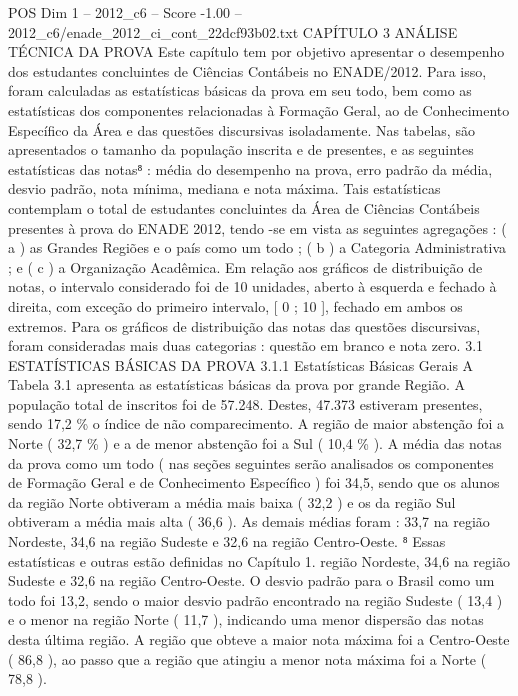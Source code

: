 \begin{textsample}{POS Dim 1 – 2012\_c6 – Score -1.00 – 2012\_c6/enade\_2012\_ci\_cont\_22dcf93b02.txt}  \label{ex:f1_pos_182}
CAPÍTULO 3 ANÁLISE TÉCNICA DA PROVA Este capítulo tem por objetivo apresentar o desempenho dos estudantes concluintes de Ciências Contábeis no ENADE/2012.
Para isso, foram calculadas as estatísticas básicas da prova em seu todo, bem como as estatísticas dos componentes relacionadas à Formação Geral, ao de Conhecimento Específico da Área e das questões discursivas isoladamente.
Nas tabelas, são apresentados o tamanho da população inscrita e de presentes, e as seguintes estatísticas das notas⁸ : média do desempenho na prova, erro padrão da média, desvio padrão, nota mínima, mediana e nota máxima.
Tais estatísticas contemplam o total de estudantes concluintes da Área de Ciências Contábeis presentes à prova do ENADE 2012, tendo -se em vista as seguintes agregações : ( a ) as Grandes Regiões e o país como um todo ; ( b ) a Categoria Administrativa ; e ( c ) a Organização Acadêmica.
Em relação aos gráficos de distribuição de notas, o intervalo considerado foi de 10 unidades, aberto à esquerda e fechado à direita, com exceção do primeiro intervalo, [ 0 ; 10 ], fechado em ambos os extremos.
Para os gráficos de distribuição das notas das questões discursivas, foram consideradas mais duas categorias : questão em branco e nota zero. 3.1 ESTATÍSTICAS BÁSICAS DA PROVA 3.1.1 Estatísticas Básicas Gerais A Tabela 3.1 apresenta as estatísticas básicas da prova por grande Região.
A população total de inscritos foi de 57.248.
Destes, 47.373 estiveram presentes, sendo 17,2 \% o índice de não comparecimento.
A região de maior abstenção foi a Norte ( 32,7 \% ) e a de menor abstenção foi a Sul ( 10,4 \% ).
A média das notas da prova como um todo ( nas seções seguintes serão analisados os componentes de Formação Geral e de Conhecimento Específico ) foi 34,5, sendo que os alunos da região Norte obtiveram a média mais baixa ( 32,2 ) e os da região Sul obtiveram a média mais alta ( 36,6 ).
As demais médias foram : 33,7 na região Nordeste, 34,6 na região Sudeste e 32,6 na região Centro-Oeste. ⁸ Essas estatísticas e outras estão definidas no Capítulo 1. região Nordeste, 34,6 na região Sudeste e 32,6 na região Centro-Oeste.
O desvio padrão para o Brasil como um todo foi 13,2, sendo o maior desvio padrão encontrado na região Sudeste ( 13,4 ) e o menor na região Norte ( 11,7 ), indicando uma menor dispersão das notas desta última região.
A região que obteve a maior nota máxima foi a Centro-Oeste ( 86,8 ), ao passo que a região que atingiu a menor nota máxima foi a Norte ( 78,8 ).

\end{textsample}
